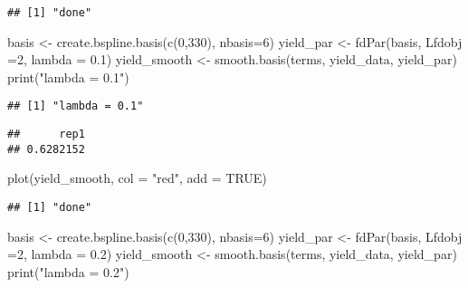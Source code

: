 \documentclass[
]{article}
\newenvironment{Shaded}{\begin{snugshade}}{\end{snugshade}}
\newcommand{\AttributeTok}[1]{\textcolor[rgb]{0.77,0.63,0.00}{#1}}
\newcommand{\ConstantTok}[1]{\textcolor[rgb]{0.00,0.00,0.00}{#1}}
\newcommand{\DecValTok}[1]{\textcolor[rgb]{0.00,0.00,0.81}{#1}}
\newcommand{\FloatTok}[1]{\textcolor[rgb]{0.00,0.00,0.81}{#1}}
\newcommand{\FunctionTok}[1]{\textcolor[rgb]{0.00,0.00,0.00}{#1}}
\newcommand{\NormalTok}[1]{#1}
\newcommand{\OtherTok}[1]{\textcolor[rgb]{0.56,0.35,0.01}{#1}}
\newcommand{\SpecialCharTok}[1]{\textcolor[rgb]{0.00,0.00,0.00}{#1}}
\newcommand{\StringTok}[1]{\textcolor[rgb]{0.31,0.60,0.02}{#1}}
\begin{document}
\begin{verbatim}
## [1] "done"
\end{verbatim}

\begin{Shaded}
\begin{Highlighting}[]
\NormalTok{basis }\OtherTok{\textless{}{-}} \FunctionTok{create.bspline.basis}\NormalTok{(}\FunctionTok{c}\NormalTok{(}\DecValTok{0}\NormalTok{,}\DecValTok{330}\NormalTok{), }\AttributeTok{nbasis=}\DecValTok{6}\NormalTok{)}
\NormalTok{yield\_par }\OtherTok{\textless{}{-}} \FunctionTok{fdPar}\NormalTok{(basis, }\AttributeTok{Lfdobj =}\DecValTok{2}\NormalTok{, }\AttributeTok{lambda =} \FloatTok{0.1}\NormalTok{)}
\NormalTok{yield\_smooth }\OtherTok{\textless{}{-}} \FunctionTok{smooth.basis}\NormalTok{(terms, yield\_data, yield\_par)}
\FunctionTok{print}\NormalTok{(}\StringTok{"lambda = 0.1"}\NormalTok{)}
\end{Highlighting}
\end{Shaded}

\begin{verbatim}
## [1] "lambda = 0.1"
\end{verbatim}

\begin{Shaded}
\end{Shaded}

\begin{verbatim}
##      rep1 
## 0.6282152
\end{verbatim}

\begin{Shaded}
\begin{Highlighting}[]
\FunctionTok{plot}\NormalTok{(yield\_smooth, }\AttributeTok{col =} \StringTok{"red"}\NormalTok{, }\AttributeTok{add =} \ConstantTok{TRUE}\NormalTok{)}
\end{Highlighting}
\end{Shaded}

\begin{verbatim}
## [1] "done"
\end{verbatim}

\begin{Shaded}
\begin{Highlighting}[]
\NormalTok{basis }\OtherTok{\textless{}{-}} \FunctionTok{create.bspline.basis}\NormalTok{(}\FunctionTok{c}\NormalTok{(}\DecValTok{0}\NormalTok{,}\DecValTok{330}\NormalTok{), }\AttributeTok{nbasis=}\DecValTok{6}\NormalTok{)}
\NormalTok{yield\_par }\OtherTok{\textless{}{-}} \FunctionTok{fdPar}\NormalTok{(basis, }\AttributeTok{Lfdobj =}\DecValTok{2}\NormalTok{, }\AttributeTok{lambda =} \FloatTok{0.2}\NormalTok{)}
\NormalTok{yield\_smooth }\OtherTok{\textless{}{-}} \FunctionTok{smooth.basis}\NormalTok{(terms, yield\_data, yield\_par)}
\FunctionTok{print}\NormalTok{(}\StringTok{"lambda = 0.2"}\NormalTok{)}
\end{Highlighting}
\end{Shaded}
\end{document}
